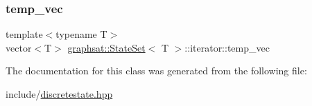 \mbox{\label{classgraphsat_1_1_state_set_1_1iterator_a1dfd23c465e65432365d802390a3e458}} 
\subsubsection{\texorpdfstring{temp\_vec}{temp\_vec}}
{\footnotesize\ttfamily template$<$typename T$>$ \\
vector$<$T$>$ \mbox{\hyperlink{classgraphsat_1_1_state_set}{graphsat\+::\+State\+Set}}$<$ T $>$\+::iterator\+::temp\+\_\+vec\hspace{0.3cm}{\ttfamily [protected]}}



The documentation for this class was generated from the following file\+:\begin{DoxyCompactItemize}
\item 
include/\mbox{\hyperlink{discretestate_8hpp}{discretestate.\+hpp}}\end{DoxyCompactItemize}
